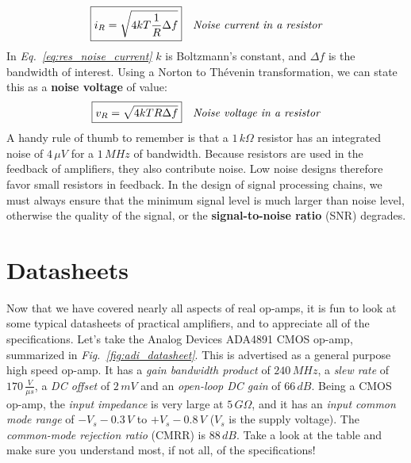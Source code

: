     \begin{align}
        \Aboxed{i_R &= \sqrt{4 k T \frac{1}{R} \Delta f}}
        &\textit{Noise current in a resistor}
        \label{eq:res_noise_current}
    \end{align}
In \emph{Eq.~\ref{eq:res_noise_current}} $k$ is Boltzmann's constant, and $\Delta f$ is the bandwidth of interest.   Using a Norton to Thévenin transformation, we can state this as a \textbf{noise voltage} of value:
    \begin{align}
        \Aboxed{v_R &= \sqrt{4 k T R \Delta f}}
        &\textit{Noise voltage in a resistor}
        \label{eq:res_noise_voltage}
    \end{align}
A handy rule of thumb to remember is that a $1\,k\Omega$ resistor has an integrated noise of $4\,\mu V$ for a $1\,MHz$ of bandwidth.  Because resistors are used in the feedback of amplifiers, they also contribute noise. Low noise designs therefore favor small resistors in feedback.  In the design of signal processing chains, we must always ensure that the minimum signal level is much larger than noise level, otherwise the quality of the signal, or the \textbf{signal-to-noise ratio} (SNR) degrades.
\section{Datasheets}
Now that we have covered nearly all aspects of real op-amps, it is fun to look at some typical datasheets of practical amplifiers, and to appreciate all of the specifications.  Let's take the Analog Devices ADA4891 CMOS op-amp, summarized in \emph{Fig.~\ref{fig:adi_datasheet}}.  This is advertised as a general purpose high speed op-amp.  It has a \textit{gain bandwidth product} of $240\,MHz$, a \textit{slew rate} of $170\,\frac{V}{\mu s}$, a \textit{DC offset} of $2\,mV$ and an \textit{open-loop DC gain} of $66\,dB$.  Being a CMOS op-amp, the \textit{input impedance} is very large at $5\,G\Omega$, and it has an \textit{input common mode range} of $-V_s - 0.3\,V$ to $+V_s - 0.8\,V$ ($V_s$ is the supply voltage).  The \textit{common-mode rejection ratio} (CMRR) is $88\,dB$.  Take a look at the table and make sure you understand most, if not all, of the specifications!

